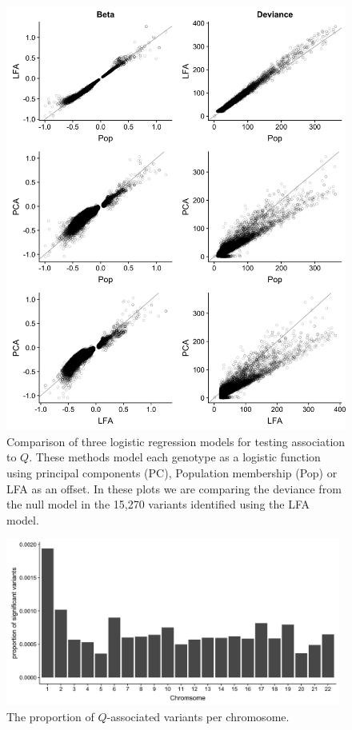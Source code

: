 \documentclass[9pt,lineno]{template}
\begin{document}
\begin{figure}[h]
\centering
\includegraphics[width=13cm,keepaspectratio]{../Figures/fits_Significant_Positions_CompareModels.jpg}
\caption{Comparison of three logistic regression models for testing association to $Q$.
These methods model each genotype as a logistic function using principal components (PC), Population membership (Pop) or LFA as an offset.
In these plots we are comparing the deviance from the null model in the 15,270 variants identified using the LFA model.}  
\label{CompareModel}
\end{figure}

\begin{figure}[h]
\centering
\includegraphics[width=11cm,keepaspectratio]{../Figures/CountPerChrom.jpg}
\caption{The proportion of $Q$-associated variants per chromosome.}  
\label{CountPerChrom}
\end{figure}
\end{document}
